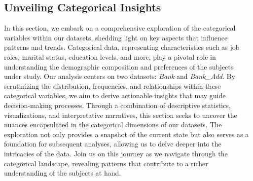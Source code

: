 \documentclass{article}
\begin{document}
            \subsection{Unveiling Categorical Insights}
 
            In this section, we embark on a comprehensive exploration of the categorical variables within our datasets, shedding light on key aspects that influence patterns and trends. Categorical data, representing characteristics such as job roles, marital status, education levels, and more, play a pivotal role in understanding the demographic composition and preferences of the subjects under study.
            Our analysis centers on two datasets: \textit{Bank} and \textit{Bank\_Add}. By scrutinizing the distribution, frequencies, and relationships within these categorical variables, we aim to derive actionable insights that may guide decision-making processes.
            Through a combination of descriptive statistics, visualizations, and interpretative narratives, this section seeks to uncover the nuances encapsulated in the categorical dimensions of our datasets. The exploration not only provides a snapshot of the current state but also serves as a foundation for subsequent analyses, allowing us to delve deeper into the intricacies of the data.
            Join us on this journey as we navigate through the categorical landscape, revealing patterns that contribute to a richer understanding of the subjects at hand.
           
\end{document}
